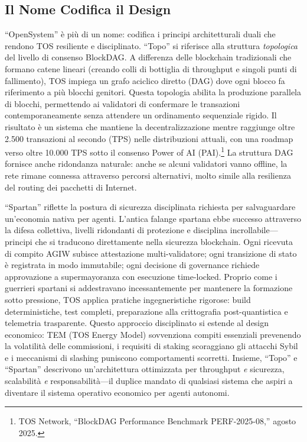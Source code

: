 \documentclass[11pt]{article}
\begin{document}
\subsection{Il Nome Codifica il Design}
``OpenSystem'' è più di un nome: codifica i principi architetturali duali che rendono TOS resiliente e disciplinato. ``Topo'' si riferisce alla struttura \emph{topologica} del livello di consenso BlockDAG. A differenza delle blockchain tradizionali che formano catene lineari (creando colli di bottiglia di throughput e singoli punti di fallimento), TOS impiega un grafo aciclico diretto (DAG) dove ogni blocco fa riferimento a più blocchi genitori. Questa topologia abilita la produzione parallela di blocchi, permettendo ai validatori di confermare le transazioni contemporaneamente senza attendere un ordinamento sequenziale rigido. Il risultato è un sistema che mantiene la decentralizzazione mentre raggiunge oltre 2.500 transazioni al secondo (TPS) nelle distribuzioni attuali, con una roadmap verso oltre 10.000 TPS sotto il consenso Power of AI (PAI).\footnote{TOS Network, ``BlockDAG Performance Benchmark PERF-2025-08,'' agosto 2025.} La struttura DAG fornisce anche ridondanza naturale: anche se alcuni validatori vanno offline, la rete rimane connessa attraverso percorsi alternativi, molto simile alla resilienza del routing dei pacchetti di Internet.

``Spartan'' riflette la postura di sicurezza disciplinata richiesta per salvaguardare un'economia nativa per agenti. L'antica falange spartana ebbe successo attraverso la difesa collettiva, livelli ridondanti di protezione e disciplina incrollabile---principi che si traducono direttamente nella sicurezza blockchain. Ogni ricevuta di compito AGIW subisce attestazione multi-validatore; ogni transizione di stato è registrata in modo immutabile; ogni decisione di governance richiede approvazione a supermayoranza con esecuzione time-locked. Proprio come i guerrieri spartani si addestravano incessantemente per mantenere la formazione sotto pressione, TOS applica pratiche ingegneristiche rigorose: build deterministiche, test completi, preparazione alla crittografia post-quantistica e telemetria trasparente. Questo approccio disciplinato si estende al design economico: TEM (TOS Energy Model) sovvenziona compiti essenziali prevenendo la volatilità delle commissioni, i requisiti di staking scoraggiano gli attacchi Sybil e i meccanismi di slashing puniscono comportamenti scorretti. Insieme, ``Topo'' e ``Spartan'' descrivono un'architettura ottimizzata per throughput \emph{e} sicurezza, scalabilità \emph{e} responsabilità---il duplice mandato di qualsiasi sistema che aspiri a diventare il sistema operativo economico per agenti autonomi.
\end{document}
